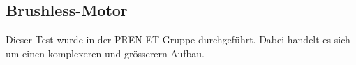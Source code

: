 \subsection{Brushless-Motor}
	Dieser Test wurde in der PREN-ET-Gruppe durchgeführt. Dabei handelt es sich um einen komplexeren und grösserern Aufbau.
    